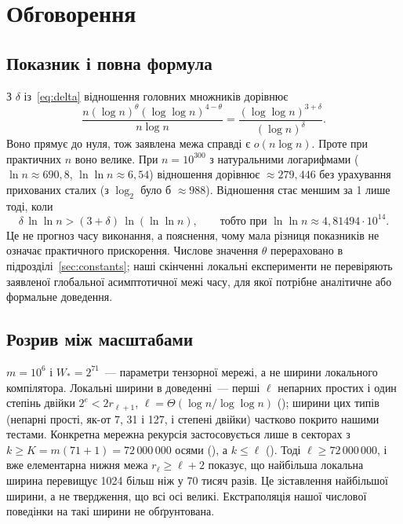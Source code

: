 \documentclass[11pt]{article}
\theoremstyle{plain}
\begin{document}
\section{Обговорення}\label{sec:discussion}

\subsection{Показник і повна формула}\label{sec:disc-theta}
З $\delta$ із~\eqref{eq:delta} відношення головних множників дорівнює
\begin{equation}\label{eq:ratio}
\frac{n(\log n)^{\theta}(\log\log n)^{4-\theta}}{n\log n}=\frac{(\log\log n)^{3+\delta}}{(\log n)^{\delta}} .
\end{equation}
Воно прямує до нуля, тож заявлена межа справді є $o(n\log n)$. Проте при практичних $n$ воно велике. При $n=10^{300}$ з натуральними логарифмами ($\ln n\approx690{,}8$, $\ln\ln n\approx6{,}54$) відношення дорівнює $\approx279{,}446$ без урахування прихованих сталих (з $\log_2$ було б $\approx988$). Відношення стає меншим за 1 лише тоді, коли
\begin{equation}\label{eq:crossover}
\delta\,\ln\ln n>(3+\delta)\,\ln(\ln\ln n),\qquad\text{тобто при }\ln\ln n\approx4{,}81494\cdot10^{14}.
\end{equation}
Це не прогноз часу виконання, а пояснення, чому мала різниця показників не означає практичного прискорення. Числове значення $\theta$ перераховано в підрозділі~\ref{sec:constants}; наші скінченні локальні експерименти не перевіряють заявленої глобальної асимптотичної межі часу, для якої потрібне аналітичне або формальне доведення.

\subsection{Розрив між масштабами}\label{sec:disc-scale}
$m=10^6$ і $W_*=2^{71}$~--- параметри тензорної мережі, а не ширини локального компілятора. Локальні ширини в доведенні~--- перші $\ell$ непарних простих і один степінь двійки $2^e<2r_{\ell+1}$, $\ell=\Theta(\log n/\log\log n)$ (); ширини цих типів (непарні прості, як-от 7, 31 і 127, і степені двійки) частково покрито нашими тестами. Конкретна мережна рекурсія застосовується лише в секторах з $k\ge K=m(71+1)=72\,000\,000$ осями (), а $k\le\ell$ (). Тоді $\ell\ge72\,000\,000$, і вже елементарна нижня межа $r_\ell\ge\ell+2$ показує, що найбільша локальна ширина перевищує 1024 більш ніж у 70 тисяч разів. Це зіставлення найбільшої ширини, а не твердження, що всі осі великі. Екстраполяція нашої числової поведінки на такі ширини не обґрунтована.
\end{document}
